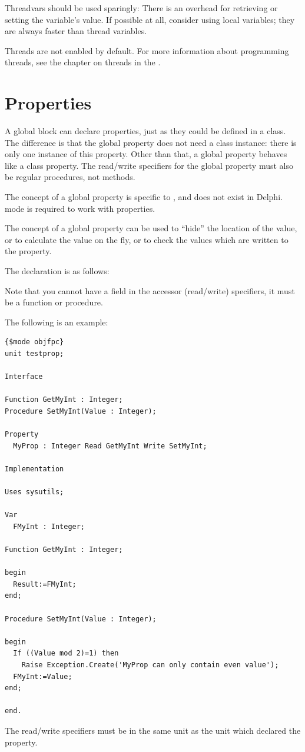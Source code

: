 Threadvars should be used sparingly: There is an overhead for retrieving
or setting the variable's value. If possible at all, consider using local
variables; they are always faster than thread variables.

Threads are not enabled by default. For more information about programming
threads, see the chapter on threads in the \progref.

\section{Properties}
A global block can declare properties, just as they could be defined in a
class. The difference is that the global property does not need a class
instance: there is only one instance of this property. Other than that, a
global property behaves like a class property. The read/write specifiers for
the global property must also be regular procedures, not methods.

The concept of a global property is specific to \fpc, and does not exist in
Delphi.  mode is required to work with properties.

The concept of a global property can be used to ``hide'' the location of the
value, or to calculate the value on the fly, or to check the values which
are written to the property.

The declaration is as follows:


Note that you cannot have a field in the accessor (read/write) specifiers,
it must be a function or procedure.

The following is an example:
\begin{verbatim}
{$mode objfpc}
unit testprop;

Interface

Function GetMyInt : Integer;
Procedure SetMyInt(Value : Integer);

Property
  MyProp : Integer Read GetMyInt Write SetMyInt;

Implementation

Uses sysutils;

Var
  FMyInt : Integer;

Function GetMyInt : Integer;

begin
  Result:=FMyInt;
end;

Procedure SetMyInt(Value : Integer);

begin
  If ((Value mod 2)=1) then
    Raise Exception.Create('MyProp can only contain even value');
  FMyInt:=Value;
end;

end.
\end{verbatim}
The read/write specifiers must be in the same unit as the unit which declared the property.

